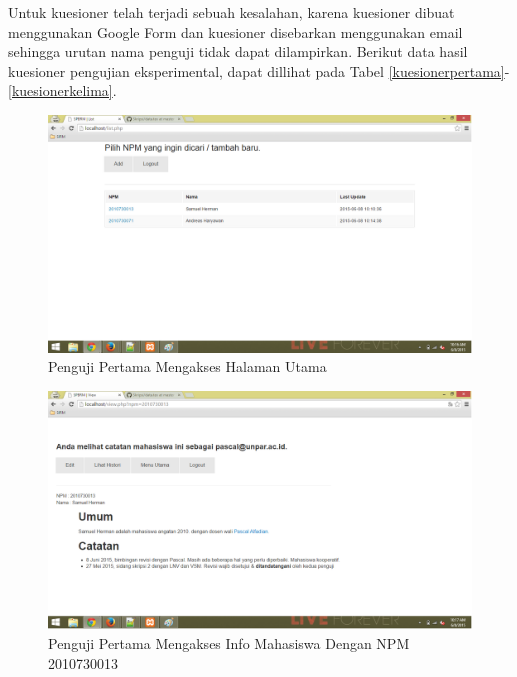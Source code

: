Untuk kuesioner telah terjadi sebuah kesalahan, karena kuesioner dibuat menggunakan Google Form dan kuesioner disebarkan menggunakan email sehingga urutan nama penguji tidak dapat dilampirkan. Berikut data hasil kuesioner pengujian eksperimental, dapat dillihat pada Tabel \ref{kuesionerpertama}-\ref{kuesionerkelima}.

\begin{figure}[p]
\centering
\includegraphics[scale=0.44]{Gambar/eks1.png}
\caption[Penguji Pertama Mengakses Halaman Utama]{Penguji Pertama Mengakses Halaman Utama} 
\label{fig:eks1}
\end{figure}

\begin{figure}[p]
\centering
\includegraphics[scale=0.44]{Gambar/eks2.png}
\caption[Penguji Pertama Mengakses Info Mahasiswa Dengan NPM 2010730013]{Penguji Pertama Mengakses Info Mahasiswa Dengan NPM 2010730013} 
\label{fig:eks2}
\end{figure}

